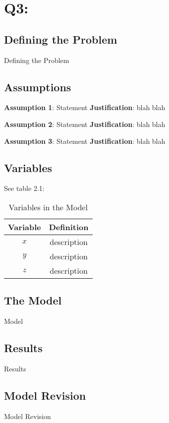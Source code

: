 \documentclass{mcm}
\numberwithin{figure}{section}
\numberwithin{table}{section}
\numberwithin{equation}{section}
\begin{document}
    \section{Q3:}

    \subsection{Defining the Problem}
    Defining the Problem

    \subsection{Assumptions}
    \noindent\textbf{Assumption 1}: Statement
    \textbf{Justification}: blah blah

    \noindent\textbf{Assumption 2}: Statement
    \textbf{Justification}: blah blah

    \noindent\textbf{Assumption 3}: Statement
    \textbf{Justification}: blah blah

    \subsection{Variables}
    See table 2.1:
    \begin{table}[h!]
        \centering
        \begin{tabular}{cc}
            \toprule
            Variable & Definition      \\
            \midrule
            $x$      & description     \\
            $y$      & description     \\
            $z$      & description     \\
            \bottomrule
        \end{tabular}
        \caption{Variables in the Model}
        \label{tab:my_label}
    \end{table}

    \subsection{The Model}
    Model

    \subsection{Results}
    Results

    \subsection{Model Revision}
    Model Revision
\end{document}
